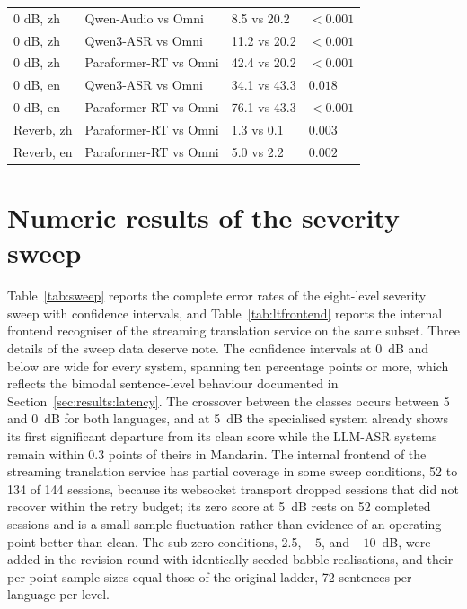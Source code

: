 \begin{table}[h]
\begin{tabular}{llll}
0 dB, zh & Qwen-Audio vs Omni & 8.5 vs 20.2 & $<0.001$ \\
0 dB, zh & Qwen3-ASR vs Omni & 11.2 vs 20.2 & $<0.001$ \\
0 dB, zh & Paraformer-RT vs Omni & 42.4 vs 20.2 & $<0.001$ \\
0 dB, en & Qwen3-ASR vs Omni & 34.1 vs 43.3 & $0.018$ \\
0 dB, en & Paraformer-RT vs Omni & 76.1 vs 43.3 & $<0.001$ \\
Reverb, zh & Paraformer-RT vs Omni & 1.3 vs 0.1 & $0.003$ \\
Reverb, en & Paraformer-RT vs Omni & 5.0 vs 2.2 & $0.002$ \\
\bottomrule
\end{tabular}
\end{table}

\section{Numeric results of the severity sweep}
\label{app:sweep}

Table~\ref{tab:sweep} reports the complete error rates of the eight-level
severity sweep with confidence intervals, and Table~\ref{tab:ltfrontend}
reports the internal frontend recogniser of the streaming translation
service on the same subset. Three details of the sweep data deserve note.
The confidence intervals at 0~dB and below are wide for every system,
spanning ten percentage points or more, which reflects the bimodal
sentence-level behaviour documented in Section~\ref{sec:results:latency}.
The crossover between the classes occurs between 5 and 0~dB for both
languages, and at 5~dB the specialised system already shows its first
significant departure from its clean score while the LLM-ASR systems
remain within 0.3 points of theirs in Mandarin. The internal frontend of
the streaming translation service has partial coverage in some sweep
conditions, 52 to 134 of 144 sessions, because its websocket transport
dropped sessions that did not recover within the retry budget; its zero
score at 5~dB rests on 52 completed sessions and is a small-sample
fluctuation rather than evidence of an operating point better than clean.
The sub-zero conditions, 2.5, $-5$, and $-10$~dB, were added in the
revision round with identically seeded babble realisations, and their
per-point sample sizes equal those of the original ladder, 72 sentences
per language per level.

